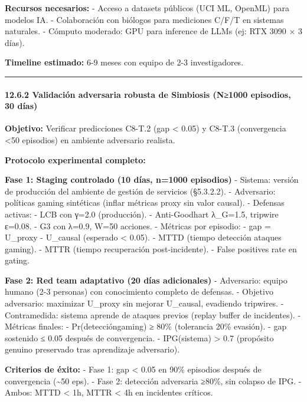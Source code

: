 \textbf{Recursos necesarios:} - Acceso a datasets públicos (UCI ML,
OpenML) para modelos IA. - Colaboración con biólogos para mediciones
C/F/T en sistemas naturales. - Cómputo moderado: GPU para inference de
LLMs (ej: RTX 3090 × 3 días).

\textbf{Timeline estimado:} 6-9 meses con equipo de 2-3 investigadores.

\begin{center}\rule{0.5\linewidth}{0.5pt}\end{center}

\paragraph{12.6.2 Validación adversaria robusta de Simbiosis (N≥1000
episodios, 30
días)}\label{validaciuxf3n-adversaria-robusta-de-simbiosis-n1000-episodios-30-duxedas}

\textbf{Objetivo:} Verificar predicciones C8-T.2 (gap \textless{} 0.05)
y C8-T.3 (convergencia \textless50 episodios) en ambiente adversario
realista.

\textbf{Protocolo experimental completo:}

\textbf{Fase 1: Staging controlado (10 días, n=1000 episodios)} -
Sistema: versión de producción del ambiente de gestión de servicios
(§5.3.2.2). - Adversario: políticas gaming sintéticas (inflar métricas
proxy sin valor causal). - Defensas activas: - LCB con γ=2.0
(producción). - Anti-Goodhart λ\_G=1.5, tripwire ε=0.08. - G3 con λ=0.9,
W=50 acciones. - Métricas por episodio: - gap = \textbar U\_proxy -
U\_causal\textbar{} (esperado \textless{} 0.05). - MTTD (tiempo
detección ataques gaming). - MTTR (tiempo recuperación post-incidente).
- False positives rate en gating.

\textbf{Fase 2: Red team adaptativo (20 días adicionales)} - Adversario:
equipo humano (2-3 personas) con conocimiento completo de defensas. -
Objetivo adversario: maximizar U\_proxy sin mejorar U\_causal, evadiendo
tripwires. - Contramedida: sistema aprende de ataques previos (replay
buffer de incidentes). - Métricas finales: -
Pr(detección\textbar gaming) ≥ 80\% (tolerancia 20\% evasión). - gap
sostenido ≤ 0.05 después de convergencia. - IPG(sistema) \textgreater{}
0.7 (propósito genuino preservado tras aprendizaje adversario).

\textbf{Criterios de éxito:} - Fase 1: gap \textless{} 0.05 en 90\%
episodios después de convergencia (\textasciitilde50 eps). - Fase 2:
detección adversaria ≥80\%, sin colapso de IPG. - Ambos: MTTD
\textless{} 1h, MTTR \textless{} 4h en incidentes críticos.

